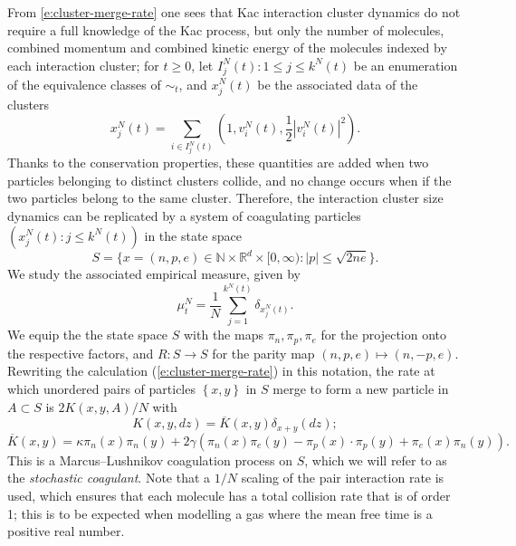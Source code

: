 \documentclass[11pt, notitlepage]{article}
\begin{document}
From \eqref{e:cluster-merge-rate} one sees that Kac interaction cluster dynamics do not require a full knowledge of the Kac process, but only the number of molecules, combined momentum and combined kinetic energy of the molecules indexed by each interaction cluster; for $t\ge 0$, let $I^N_j(t): 1\le j \le k^N(t)$ be an enumeration of the equivalence classes of $\sim_t$, and $x^N_j(t)$ be the associated data of the clusters \begin{equation}
    x^N_j(t)=\sum_{i \in I^N_j(t)}\left(1,v^N_i(t),\frac{1}{2}\left|v^N_i(t)\right|^2\right).
\end{equation} 
Thanks to the conservation properties, these quantities are added when two particles belonging to distinct clusters collide, and no change occurs when if the two particles belong to the same cluster. Therefore, the interaction cluster size dynamics can be replicated by a system of coagulating particles $(x^N_j(t): j\le k^N(t))$ in the state space
\begin{equation}
    S=\{x=(n, p, e) \in \mathbb{N}\times \mathbb{R}^d\times [0,\infty): |p|\leq \sqrt{2ne} \}. 
\end{equation} We study the associated empirical measure, given by \begin{equation}\label{eq: sc1}\mu^N_t = \frac{1}{N}\sum_{j=1}^{k^N(t)} \delta_{x^N_j(t)}. \end{equation} We equip the the state space $S$ with the maps $\pi_n, \pi_p, \pi_e$ for the projection onto the respective factors, and $R:S\rightarrow S$ for the parity map $(n,p,e)\mapsto (n,-p,e)$. Rewriting the calculation (\ref{e:cluster-merge-rate}) in this notation, the rate at which unordered pairs of particles $\left\{ x,y \right\}$ in $S$ merge to form a new particle in $A \subset S$ is $2K(x,y, A)/N$ with
\begin{equation}\label{eq: smoluchowski kernel}
    K(x,y,dz)=\overline{K}(x,y)\delta_{x+y}(dz);
    \end{equation} \begin{equation} \label{eq: overline K}  \overline{K}(x,y)=\kappa \pi_n(x)\pi_n(y)+2\gamma\left(\pi_n(x)\pi_e(y)-\pi_p(x)\cdot \pi_p(y)+\pi_e(x)\pi_n(y)\right).
\end{equation} 
This is a Marcus--Lushnikov coagulation process \cite{L78} on $S$, which we will refer to as the \emph{stochastic coagulant}.
Note that a $1/N$ scaling of the pair interaction rate is used, which ensures that each molecule has a total collision rate that is of order 1; this is to be expected when modelling a gas where the mean free time is a positive real number.
\end{document}
